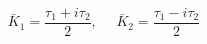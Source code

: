 \begin{equation}
\bar{K}_1=\frac{\tau_1+i\tau_2}{2},~~~~~~\bar{K}_2=\frac{\tau_1-i\tau_2}{2}
\end{equation}

